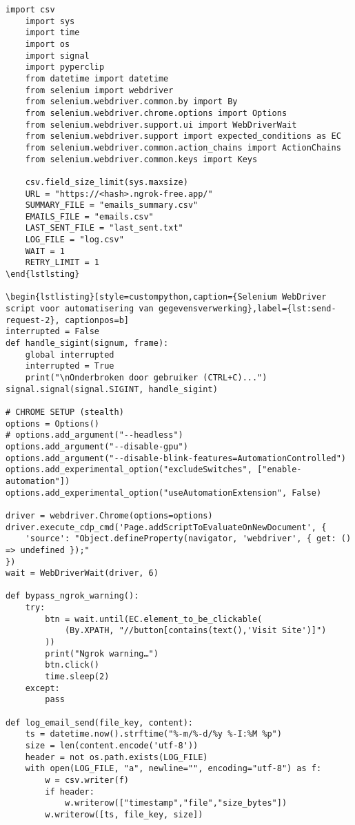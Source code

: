 \begin{lstlisting}[style=custompython,caption={Selenium WebDriver script voor automatisering van gegevensverwerking variabelen},label={lst:send-request}, captionpos=b]
    import csv
    import sys
    import time
    import os
    import signal
    import pyperclip
    from datetime import datetime
    from selenium import webdriver
    from selenium.webdriver.common.by import By
    from selenium.webdriver.chrome.options import Options
    from selenium.webdriver.support.ui import WebDriverWait
    from selenium.webdriver.support import expected_conditions as EC
    from selenium.webdriver.common.action_chains import ActionChains
    from selenium.webdriver.common.keys import Keys

    csv.field_size_limit(sys.maxsize)
    URL = "https://<hash>.ngrok-free.app/"
    SUMMARY_FILE = "emails_summary.csv"
    EMAILS_FILE = "emails.csv"
    LAST_SENT_FILE = "last_sent.txt"
    LOG_FILE = "log.csv"
    WAIT = 1
    RETRY_LIMIT = 1
\end{lstlsting}

\begin{lstlisting}[style=custompython,caption={Selenium WebDriver script voor automatisering van gegevensverwerking},label={lst:send-request-2}, captionpos=b]
interrupted = False
def handle_sigint(signum, frame):
    global interrupted
    interrupted = True
    print("\nOnderbroken door gebruiker (CTRL+C)...")
signal.signal(signal.SIGINT, handle_sigint)

# CHROME SETUP (stealth)
options = Options()
# options.add_argument("--headless")
options.add_argument("--disable-gpu")
options.add_argument("--disable-blink-features=AutomationControlled")
options.add_experimental_option("excludeSwitches", ["enable-automation"])
options.add_experimental_option("useAutomationExtension", False)

driver = webdriver.Chrome(options=options)
driver.execute_cdp_cmd('Page.addScriptToEvaluateOnNewDocument', {
    'source': "Object.defineProperty(navigator, 'webdriver', { get: () => undefined });"
})
wait = WebDriverWait(driver, 6)

def bypass_ngrok_warning():
    try:
        btn = wait.until(EC.element_to_be_clickable(
            (By.XPATH, "//button[contains(text(),'Visit Site')]")
        ))
        print("Ngrok warning…")
        btn.click()
        time.sleep(2)
    except:
        pass

def log_email_send(file_key, content):
    ts = datetime.now().strftime("%-m/%-d/%y %-I:%M %p")
    size = len(content.encode('utf-8'))
    header = not os.path.exists(LOG_FILE)
    with open(LOG_FILE, "a", newline="", encoding="utf-8") as f:
        w = csv.writer(f)
        if header:
            w.writerow(["timestamp","file","size_bytes"])
        w.writerow([ts, file_key, size])


\end{lstlisting}
